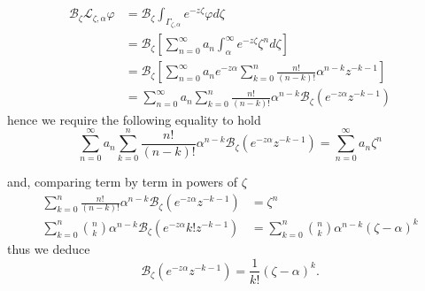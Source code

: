 \documentclass{article}
\theoremstyle{definition}
\newcommand{\laplace}{\mathcal{L}}
\newcommand{\borel}{\mathcal{B}}
\theoremstyle{plain}
\begin{document}
  \begin{align*}
      \borel_\zeta\laplace_{\zeta,\alpha}\varphi&=\borel_\zeta\int_{\Gamma_{\zeta,\alpha}}e^{-z\zeta}\varphi d\zeta\\
      &=\borel_\zeta\left[\sum_{n=0}^{\infty}a_n \int_{\alpha}^{\infty}e^{-z\zeta} \zeta^nd\zeta\right]\\
      &=\borel_\zeta\left[\sum_{n=0}^{\infty}a_n e^{-z\alpha}\sum_{k=0}^n \frac{n!}{(n-k)!}\alpha^{n-k}z^{-k-1}\right]\\
      &=\sum_{n=0}^{\infty}a_n \sum_{k=0}^n \frac{n!}{(n-k)!}\alpha^{n-k}\borel_\zeta(e^{-z\alpha}z^{-k-1})
  \end{align*}
hence we require the following equality to hold  
\[ \sum_{n=0}^{\infty}a_n \sum_{k=0}^n \frac{n!}{(n-k)!}\alpha^{n-k}\borel_\zeta(e^{-z\alpha}z^{-k-1})=\sum_{n=0}^{\infty}a_n \zeta^n\]

and, comparing term by term in powers of $\zeta$ %
  \begin{align*}
      \sum_{k=0}^n \frac{n!}{(n-k)!}\alpha^{n-k}\borel_\zeta(e^{-z\alpha}z^{-k-1})&=\zeta^n\\
      \sum_{k=0}^n {n\choose k} \alpha^{n-k} \borel_\zeta(e^{-z\alpha} k! z^{-k-1})&=\sum_{k=0}^n {n\choose k} \alpha^{n-k}(\zeta-\alpha)^k
  \end{align*}
  thus we deduce \[\borel_\zeta(e^{-z\alpha}z^{-k-1})=\frac{1}{k!}(\zeta-\alpha)^k.\]
\end{document}
